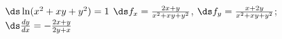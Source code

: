 {$\ds \ln(x^2+xy+y^2)=1$}
{$\ds f_x = \frac{2x+y}{x^2+xy+y^2}$, $\ds f_y = \frac{x+2y}{x^2+xy+y^2}$;\\
$\ds\frac{dy}{dx} = -\frac{2x+y}{2y+x}$
}
